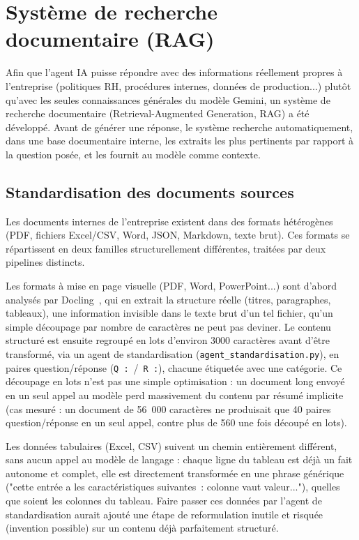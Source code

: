 \documentclass[12pt,a4paper]{report}
\begin{document}
\section{Système de recherche documentaire (RAG)}

Afin que l'agent IA puisse répondre avec des informations réellement
propres à l'entreprise (politiques RH, procédures internes, données de
production...) plutôt qu'avec les seules connaissances générales du
modèle Gemini, un système de recherche documentaire (Retrieval-Augmented
Generation, RAG) a été développé. Avant de générer une réponse, le
système recherche automatiquement, dans une base documentaire interne,
les extraits les plus pertinents par rapport à la question posée, et les
fournit au modèle comme contexte.

\subsection{Standardisation des documents sources}

Les documents internes de l'entreprise existent dans des formats
hétérogènes (PDF, fichiers Excel/CSV, Word, JSON, Markdown, texte brut).
Ces formats se répartissent en deux familles structurellement
différentes, traitées par deux pipelines distincts.

Les formats à mise en page visuelle (PDF, Word, PowerPoint...) sont
d'abord analysés par Docling~\cite{docling}, qui en extrait la structure réelle
(titres, paragraphes, tableaux), une information invisible dans le
texte brut d'un tel fichier, qu'un simple découpage par nombre de
caractères ne peut pas deviner. Le contenu structuré est ensuite
regroupé en lots d'environ 3000 caractères avant d'être transformé, via
un agent de standardisation (\texttt{agent\_standardisation.py}), en
paires question/réponse (\texttt{Q~:}~/~\texttt{R~:}), chacune étiquetée
avec une catégorie. Ce découpage en lots n'est pas une simple
optimisation : un document long envoyé en un seul appel au modèle perd
massivement du contenu par résumé implicite (cas mesuré : un document de
56~000 caractères ne produisait que 40 paires question/réponse en un
seul appel, contre plus de 560 une fois découpé en lots).

Les données tabulaires (Excel, CSV) suivent un chemin entièrement
différent, sans aucun appel au modèle de langage : chaque ligne du
tableau est déjà un fait autonome et complet, elle est directement
transformée en une phrase générique ("cette entrée a les
caractéristiques suivantes~: colonne vaut valeur..."), quelles que
soient les colonnes du tableau. Faire passer ces données par l'agent de
standardisation aurait ajouté une étape de reformulation inutile et
risquée (invention possible) sur un contenu déjà parfaitement
structuré.
\end{document}
